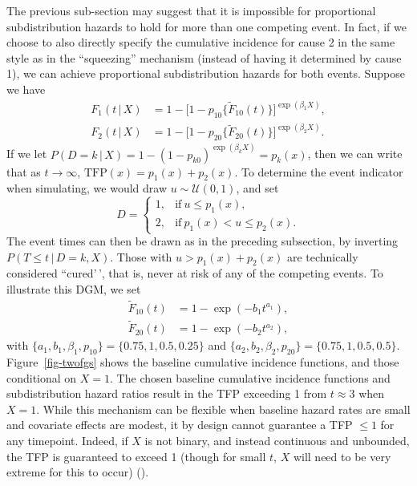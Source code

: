 \documentclass[
  letterpaper,
  paper=240mm:170mm,
  twoside=true,
  open=right,
  fontsize=10pt,
  pagesize=false,
  BCOR=15mm,
  DIV=14,
  headinclude=true,
  footinclude=false,
  headsepline=on]{scrbook}
\newcommand{\given}{\,|\,}
\begin{document}
The previous sub-section may suggest that it is impossible for
proportional subdistribution hazards to hold for more than one competing
event. In fact, if we choose to also directly specify the cumulative
incidence for cause 2 in the same style as in the ``squeezing''
mechanism (instead of having it determined by cause 1), we can achieve
proportional subdistribution hazards for both events. Suppose we have
\begin{align*}
    F_1(t \given X) &= 1 - \big[1 - p_{10}\{\tilde{F}_{10}(t)\} \big]^{\exp(\beta_1X)}, \\
    F_2(t \given X) &= 1 - \big[1 - p_{20}\{\tilde{F}_{20}(t)\} \big]^{\exp(\beta_2X)}.
\end{align*} If we let
\(P(D = k \given X) = 1 - (1 - p_{k0})^{\exp(\beta_{k}X)} = p_k(x)\),
then we can write that as \(t \to \infty\),
\(\text{TFP}(x) = p_1(x) + p_2(x)\). To determine the event indicator
when simulating, we would draw \(u \sim \mathcal{U}(0,1)\), and set
\begin{equation*}
    D = 
    \begin{cases}
        1, & \text{if}\ u \leq p_1(x), \\
        2, & \text{if}\ p_1(x) < u \leq p_2(x). 
    \end{cases}
\end{equation*} The event times can then be drawn as in the preceding
subsection, by inverting \(P(T \leq t \given D=k, X)\). Those with
\(u > p_1(x) + p_2(x)\) are technically considered ``cured'\,', that is,
never at risk of any of the competing events. To illustrate this DGM, we
set \begin{align*}
    \tilde{F}_{10}(t) &= 1 - \exp(-b_1t^{a_1}), \\
    \tilde{F}_{20}(t) &= 1 - \exp(-b_2t^{a_2}),
\end{align*} with
\(\{a_1, b_1, \beta_1, p_{10}\} = \{0.75, 1, 0.5, 0.25\}\) and
\(\{a_2, b_2,\beta_{2}, p_{20}\} = \{0.75, 1, 0.5, 0.5\}\).
Figure~\ref{fig-twofgs} shows the baseline cumulative incidence
functions, and those conditional on \(X = 1\). The chosen baseline
cumulative incidence functions and subdistribution hazard ratios result
in the TFP exceeding 1 from \(t \approx 3\) when \(X = 1\). While this
mechanism can be flexible when baseline hazard rates are small and
covariate effects are modest, it by design cannot guarantee a TFP
\(\leq 1\) for any timepoint. Indeed, if \(X\) is not binary, and
instead continuous and unbounded, the TFP is guaranteed to exceed 1
(though for small \(t\), \(X\) will need to be very extreme for this to
occur) ().
\end{document}
